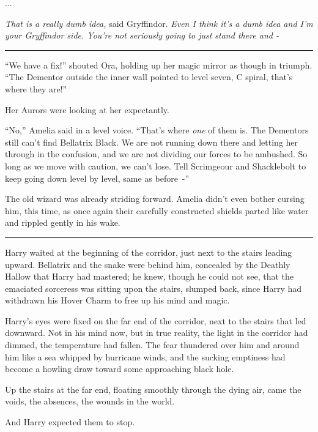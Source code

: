 ...

\emph{That is a really dumb idea,} said Gryffindor. \emph{Even I think it's a dumb idea and I'm your Gryffindor side. You're not seriously going to just stand there and -}

\begin{center}\rule{3in}{0.4pt}\end{center}

``We have a fix!'' shouted Ora, holding up her magic mirror as though in triumph. ``The Dementor outside the inner wall pointed to level seven, C spiral, that's where they are!''

Her Aurors were looking at her expectantly.

``No,'' Amelia said in a level voice. ``That's where \emph{one} of them is. The Dementors still can't find Bellatrix Black. We are not running down there and letting her through in the confusion, and we are not dividing our forces to be ambushed. So long as we move with caution, we can't lose. Tell Scrimgeour and Shacklebolt to keep going down level by level, same as before~-''

The old wizard was already striding forward. Amelia didn't even bother cursing him, this time, as once again their carefully constructed shields parted like water and rippled gently in his wake.

\begin{center}\rule{3in}{0.4pt}\end{center}

Harry waited at the beginning of the corridor, just next to the stairs leading upward. Bellatrix and the snake were behind him, concealed by the Deathly Hallow that Harry had mastered; he knew, though he could not see, that the emaciated sorceress was sitting upon the stairs, slumped back, since Harry had withdrawn his Hover Charm to free up his mind and magic.

Harry's eyes were fixed on the far end of the corridor, next to the stairs that led downward. Not in his mind now, but in true reality, the light in the corridor had dimmed, the temperature had fallen. The fear thundered over him and around him like a sea whipped by hurricane winds, and the sucking emptiness had become a howling draw toward some approaching black hole.

Up the stairs at the far end, floating smoothly through the dying air, came the voids, the absences, the wounds in the world.

And Harry expected them to stop.

